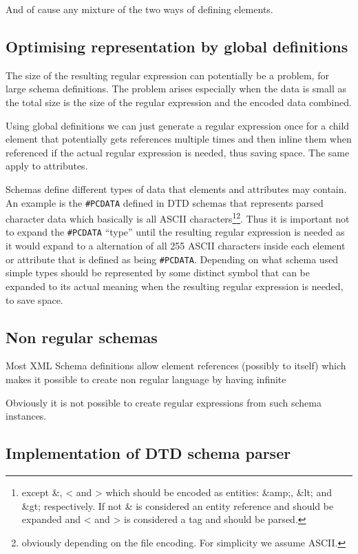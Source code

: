 \documentclass[a4paper, oneside]{memoir}
\theoremstyle{definition}
\begin{document}
And of cause any mixture of the two ways of defining elements.

\subsection{Optimising representation by global definitions}

The size of the resulting regular expression can potentially be a problem, for
large schema definitions. The problem arises especially when the data is small
as the total size is the size of the regular expression and the encoded data
combined.

Using global definitions we can just generate a regular expression once for a
child element that potentially gets references multiple times and then inline
them when referenced if the actual regular expression is needed, thus saving
space. The same apply to attributes.
\label{sec:global-definitions-save-space}

Schemas define different types of data that elements and attributes may
contain. An example is the \texttt{\#PCDATA} defined in DTD schemas that
represents parsed character data which basically is all ASCII
characters\footnote{except \&, < and > which should be encoded as entities:
  \&amp;, \&lt; and \&gt; respectively. If not \& is considered an entity
  reference and should be expanded and < and > is considered a tag and should be
  parsed.}\footnote{obviously depending on the file encoding. For simplicity we
  assume ASCII.}. Thus it is important not to expand the \texttt{\#PCDATA}
``type'' until the resulting regular expression is needed as it would expand to
a alternation of all 255 ASCII characters inside each element or attribute that
is defined as being \texttt{\#PCDATA}. Depending on what schema used simple
types should be represented by some distinct symbol that can be expanded to its
actual meaning when the resulting regular expression is needed, to save space.

\subsection{ Non regular schemas}

Most XML Schema definitions allow element references (possibly to itself) which
makes it possible to create non regular language by having infinite

Obviously it is not possible to create regular expressions from such schema
instances.

\subsection{Implementation of DTD schema parser}
\end{document}
